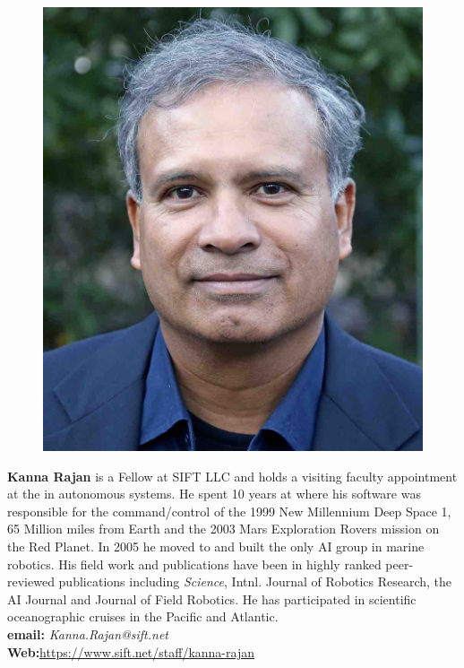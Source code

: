 \documentclass[12pt]{article}
\begin{document}
\parbox{6.5in}{
\begin{figure}
  \centering
  \includegraphics[width=.75\linewidth]{fig/Krajan.jpg}
\end{figure}
\textbf{Kanna Rajan}\footnotemark{} is a Fellow at SIFT LLC and holds a visiting faculty
appointment at the \univ in autonomous systems. He spent 10 years at
\inst where his software was responsible for the command/control of
the 1999 New Millennium Deep Space 1, 65 Million miles from Earth and
the 2003 Mars Exploration Rovers mission on the Red Planet. In 2005 he
moved to \mba and built the only AI group in marine robotics. His
field work and publications have been in highly ranked peer-reviewed
publications including \emph{Science}, Intnl. Journal of Robotics
Research, the AI Journal and Journal of Field Robotics. He has
participated in scientific oceanographic cruises in the Pacific and
Atlantic.
\\
\textbf{email: }\emph{Kanna.Rajan@sift.net}\\
\textbf{Web:}\url{https://www.sift.net/staff/kanna-rajan} 
}
\end{document}
